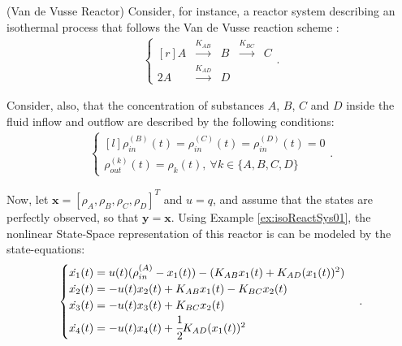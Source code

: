 \documentclass[a4paper,11pt]{book}
\numberwithin{figure}{chapter}
\numberwithin{equation}{chapter}
\numberwithin{table}{chapter}
\theoremstyle{definition}
\newtheorem{example}{Example}[chapter]
\newcounter{boxed-theorem}
\newcounter{boxed-lemma}
\newcounter{boxed-definition}
\newcounter{boxed-example}
\newenvironment{boxed-example}[1]
{\colorlet{shadecolor}{pastelRed!15} \begin{shaded} \begin{example}{#1}}
{\end{example} \end{shaded}}
\begin{document}
\begin{boxed-example}{(Van de Vusse Reactor)} \label{ex:vanDeVusse01}
	Consider, for instance, a reactor system describing an isothermal process that follows the Van de Vusse reaction scheme \cite{VanDeVusse:1964}:
	\begin{align}
	\left\{ \begin{matrix*}[r]
	    A & \overset{K_{AB}}{\longrightarrow} & B & \overset{K_{BC}}{\longrightarrow} & C \\
	    2 A & \overset{K_{AD}}{\longrightarrow} & D & &
	\end{matrix*} \right.
	.\end{align}
	
\noindent Consider, also, that the concentration of substances $A$, $B$, $C$ and $D$ inside the fluid inflow and outflow are described by the following conditions: 
	\begin{align}
	\left\{ \begin{matrix*}[l]
		\rho_{in}^{(B)}(t) = \rho_{in}^{(C)}(t) = \rho_{in}^{(D)}(t) = 0 \\
		\rho_{out}^{(k)}(t) = \rho_k(t),\ \forall k \in \{A, B, C, D\}
	\end{matrix*} \right.
	.\end{align}
	
\noindent Now, let $\bm{x} = [\rho_A, \rho_B, \rho_C, \rho_D]^T$ and $u = q$, and assume that the states are perfectly observed, so that $\bm{y} = \bm{x}$. Using Example \ref{ex:isoReactSys01},  the nonlinear State-Space representation of this reactor is can be modeled by the state-equations:
	\begin{align}
	\begin{cases}
	    \dot{x_1}(t) = u(t) (\rho_{in}^{(A)} - x_1(t)) - (K_{AB} x_1(t) + K_{AD} (x_1(t))^2)\\
	    \dot{x_2}(t) = -u(t) x_2(t) + K_{AB} x_1(t) - K_{BC} x_2(t) \\
	    \dot{x_3}(t) = -u(t) x_3(t) + K_{BC} x_2(t) \\
	    \dot{x_4}(t) = -u(t) x_4(t) + \cfrac{1}{2} K_{AD} (x_1(t))^2
	\end{cases}
	.\end{align}
	

\end{boxed-example}
\end{document}
